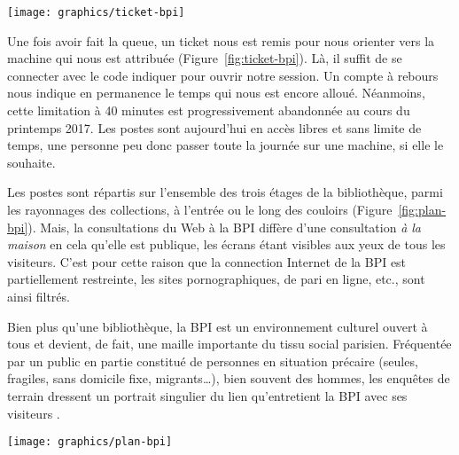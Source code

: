 \documentclass[symmetric,justified,marginals=raggedouter]{tufte-book}
\begin{document}
\begin{marginfigure}%
  \texttt{[image: graphics/ticket-bpi]}
  \vspace*{0.2cm}  
  \caption{Ticket de réservation d'une session de 40 mn sur l'un des postes Internet Libre de la BPI}
  \label{fig:ticket-bpi}
\end{marginfigure} 

Une fois avoir fait la queue, un ticket nous est remis pour nous orienter vers la machine qui nous est attribuée (Figure~\ref{fig:ticket-bpi}). Là, il suffit de se connecter avec le code indiquer pour ouvrir notre session. Un compte à rebours nous indique en permanence le temps qui nous est encore alloué. Néanmoins, cette limitation à 40 minutes est progressivement abandonnée au cours du printemps 2017. Les postes sont aujourd'hui en accès libres et sans limite de temps, une personne peu donc passer toute la journée sur une machine, si elle le souhaite. 

Les postes sont répartis sur l'ensemble des trois étages de la bibliothèque, parmi les rayonnages des collections, à l'entrée ou le long des couloirs (Figure~\ref{fig:plan-bpi}). Mais, la consultations du Web à la BPI diffère d'une consultation \textit{à la maison} en cela qu'elle est publique, les écrans étant visibles aux yeux de tous les visiteurs. C'est pour cette raison que la connection Internet de la BPI est partiellement restreinte, les sites pornographiques, de pari en ligne, etc., sont ainsi filtrés.

Bien plus qu'une bibliothèque, la BPI est un environnement culturel ouvert à tous et devient, de fait, une maille importante du tissu social parisien. Fréquentée par un public en partie constitué de personnes en situation précaire (seules, fragiles, sans domicile fixe, migrants\ldots{}), bien souvent des hommes, les enquêtes de terrain dressent un portrait singulier du lien qu'entretient la BPI avec ses visiteurs \citep{paugam_pauvres_2013}. 

\begin{figure*}
  \texttt{[image: graphics/plan-bpi]}
  \caption{Implantation des postes Internet Libre (rouge) sur les trois étages de la BPI}
  \label{fig:plan-bpi}
\end{figure*}
\end{document}
